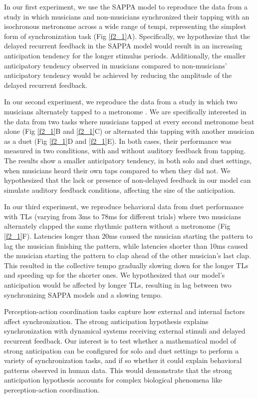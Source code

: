 \documentclass{report}
\begin{document}
In our first experiment, we use the SAPPA model to reproduce the data from a study in which musicians and non-musicians synchronized their tapping with an isochronous metronome across a wide range of tempi, representing the simplest form of synchronization task \cite{repp2007tapping} (Fig \ref{f2_1}A). Specifically, we hypothesize that the delayed recurrent feedback in the SAPPA model would result in an increasing anticipation tendency for the longer stimulus periods. Additionally, the smaller anticipatory tendency observed in musicians compared to non-musicians’ anticipatory tendency would be achieved by reducing the amplitude of the delayed recurrent feedback.

In our second experiment, we reproduce the data from a study in which two musicians alternately tapped to a metronome \cite{nowicki2013mutual}. We are specifically interested in the data from two tasks where musicians tapped at every second metronome beat alone (Fig \ref{f2_1}B and \ref{f2_1}C) or alternated this tapping with another musician as a duet (Fig \ref{f2_1}D and \ref{f2_1}E). In both cases, their performance was measured in two conditions, with and without auditory feedback from tapping. The results show a smaller anticipatory tendency, in both solo and duet settings, when musicians heard their own taps compared to when they did not. We hypothesized that the lack or presence of non-delayed feedback in our model can simulate auditory feedback conditions, affecting the size of the anticipation.

In our third experiment, we reproduce behavioral data from duet performance with TLs (varying from 3ms to 78ms for different trials) where two musicians alternately clapped the same rhythmic pattern without a metronome \cite{chafe2010effect} (Fig \ref{f2_1}F). Latencies longer than 20ms caused the musician starting the pattern to lag the musician finishing the pattern, while latencies shorter than 10ms caused the musician starting the pattern to clap ahead of the other musician’s last clap. This resulted in the collective tempo gradually slowing down for the longer TLs and speeding up for the shorter ones. We hypothesized that our model’s anticipation would be affected by longer TLs, resulting in lag between two synchronizing SAPPA models and a slowing tempo.

Perception-action coordination tasks capture how external and internal factors affect synchronization. The strong anticipation hypothesis explains synchronization with dynamical systems receiving external stimuli and delayed recurrent feedback. Our interest is to test whether a mathematical model of strong anticipation can be configured for solo and duet settings to perform a variety of synchronization tasks, and if so whether it could explain behavioral patterns observed in human data. This would demonstrate that the strong anticipation hypothesis accounts for complex biological phenomena like perception-action coordination.
\end{document}
